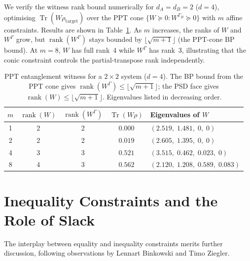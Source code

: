 \documentclass[11pt,a4paper]{article}
\theoremstyle{definition}
\newcommand{\rank}{\operatorname{rank}}
\newcommand{\Tr}{\operatorname{Tr}}
\begin{document}
We verify the witness rank bound numerically for
$d_A = d_B = 2$ ($d = 4$), optimising $\Tr(W\rho_{\text{target}})$
over the PPT cone $\{W \succeq 0 : W^{\Gamma_B} \succeq 0\}$
with $m$ affine constraints.  Results are shown in
Table~\ref{tab:ppt-witness}.  As $m$ increases, the ranks of
$W$ and $W^{\Gamma}$ grow, but $\rank(W^{\Gamma})$ stays bounded
by $\lfloor\sqrt{m+1}\rfloor$ (the PPT-cone BP bound).
At $m = 8$, $W$ has full rank~4 while $W^{\Gamma}$ has rank~3,
illustrating that the conic constraint controls the partial-transpose
rank independently.

\begin{table}[htbp]
\centering
\caption{PPT entanglement witness for a $2 \times 2$ system
($d = 4$).  The BP bound from the PPT cone gives
$\rank(W^{\Gamma}) \leq \lfloor\sqrt{m+1}\rfloor$; the PSD
face gives $\rank(W) \leq \lfloor\sqrt{m+1}\rfloor$.
Eigenvalues listed in decreasing order.}
\label{tab:ppt-witness}
\begin{tabular}{ccccl}
\toprule
$m$ & $\rank(W)$ & $\rank(W^{\Gamma})$
  & $\Tr(W\rho)$ & \textbf{Eigenvalues of $W$} \\
\midrule
1 & 2 & 2 & $0.000$ & $(2.519,\; 1.481,\; 0,\; 0)$ \\
2 & 2 & 2 & $0.019$ & $(2.605,\; 1.395,\; 0,\; 0)$ \\
4 & 3 & 3 & $0.521$ & $(3.515,\; 0.462,\; 0.023,\; 0)$ \\
8 & 4 & 3 & $0.562$ & $(2.120,\; 1.208,\; 0.589,\; 0.083)$ \\
\bottomrule
\end{tabular}
\end{table}

\section{Inequality Constraints and the Role of Slack}
\label{sec:inequality}

The interplay between equality and inequality constraints merits
further discussion, following observations by Lennart Binkowski
and Timo Ziegler.
\end{document}
